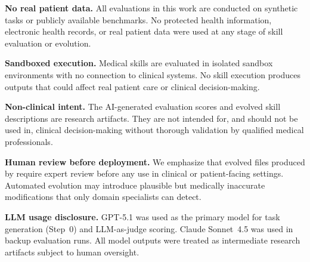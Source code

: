 
\noindent
\textbf{No real patient data.}\quad
All evaluations in this work are conducted on synthetic tasks or publicly available benchmarks.
No protected health information, electronic health records, or real patient data were used at any stage of skill evaluation or evolution.

\textbf{Sandboxed execution.}\quad
Medical skills are evaluated in isolated sandbox environments with no connection to clinical systems.
No skill execution produces outputs that could affect real patient care or clinical decision-making.

\textbf{Non-clinical intent.}\quad
The AI-generated evaluation scores and evolved skill descriptions are research artifacts.
They are not intended for, and should not be used in, clinical decision-making without thorough validation by qualified medical professionals.

\textbf{Human review before deployment.}\quad
We emphasize that evolved \skillmd files produced by \gepamed require expert review before any use in clinical or patient-facing settings.
Automated evolution may introduce plausible but medically inaccurate modifications that only domain specialists can detect.

\textbf{LLM usage disclosure.}\quad
GPT-5.1 was used as the primary model for task generation (Step~0) and LLM-as-judge scoring.
Claude Sonnet~4.5 was used in backup evaluation runs.
All model outputs were treated as intermediate research artifacts subject to human oversight.
